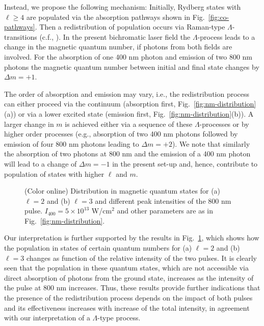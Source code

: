 Instead, we propose the following mechanism: Initially, Rydberg states with $\ell \ge 4$ are populated via the absorption pathways shown in Fig.\ \ref{fig:co-pathways}. Then a redistribution of population occurs via Raman-type $\Lambda$-transitions (c.f., \cite{gray78,fedorov96}). In the present bichromatic laser field the $\Lambda$-process leads to a change in the magnetic quantum number, if photons from both fields are involved. For the absorption of one 400 nm photon and emission of two 800 nm photons the magnetic quantum number between initial and final state changes by $\Delta m = +1$.
 
The order of absorption and emission may vary, i.e., the redistribution process can either proceed via the continuum (absorption first, Fig.~\ref{fig:nm-distribution}(a)) or via a lower excited state (emission first, Fig.~\ref{fig:nm-distribution}(b)). A larger change in $m$ is achieved either via a sequence of these $\Lambda$-processes or by higher order processes (e.g., absorption of two 400 nm photons followed by emission of four 800 nm photons leading to $\Delta m = +2$). We note that similarly the absorption of two photons at 800 nm and the emission of a 400 nm photon will lead to a change of $\Delta m = -1$ in the present set-up and, hence, contribute to population of states with higher $\ell$ and $m$.

\begin{figure}[h!]
\caption{\label{fig:nm-fixedl-distribution}
(Color online) 
{
Distribution in magnetic quantum states for (a) $\ell = 2$ and (b) $\ell = 3 $ and different peak intensities of the 800 nm pulse. $I_{400} = 5\times 10^{13}$ W/cm$^2$ and other parameters are as in Fig.~\ref{fig:nm-distribution}.}
}
\end{figure}

Our interpretation is further supported by the results in Fig.~\ref{fig:nm-fixedl-distribution}, which shows how the population in states of certain quantum numbers for (a) $\ell = 2$ and (b) $\ell = 3$ changes as function of the relative intensity of the two pulses. It is clearly seen that the population in these quantum states, which are not accessible via direct absorption of photons from the ground state, increases as the intensity of the pulse at 800 nm increases. Thus, these results provide further indications that the presence of the redistribution process depends on the impact of both pulses and its effectiveness increases with increase of the total intensity, in agreement with our interpretation of a $\Lambda$-type process.

